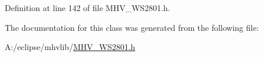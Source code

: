 Definition at line 142 of file M\-H\-V\-\_\-\-W\-S2801.\-h.



The documentation for this class was generated from the following file\-:\begin{DoxyCompactItemize}
\item 
A\-:/eclipse/mhvlib/\hyperlink{_m_h_v___w_s2801_8h}{M\-H\-V\-\_\-\-W\-S2801.\-h}\end{DoxyCompactItemize}
